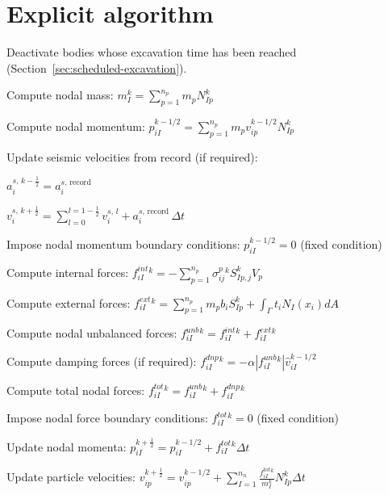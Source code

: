 \section{Explicit algorithm}\label{sec:explicit-algorithm}

\begin{algorithm}
	\caption{Explicit MPM integration scheme}
	\begin{algorithmic}[1]
		\State Deactivate bodies whose excavation time has been reached (Section~\ref{sec:scheduled-excavation}).
		
		\State Compute nodal mass:
		$ m_I^k = \sum_{p=1}^{n_p} m_p N_{Ip}^k $
		
		\State Compute nodal momentum:
		$ p_{iI}^{k-1/2} = \sum_{p=1}^{n_p} m_p v_{ip}^{k-1/2} N_{Ip}^k $
		
		\State Update seismic velocities from record (if required):
		
		$a_{i}^{s,\,k-\frac12} = a_{i}^{s,\,\text{record}}$
		
		$ v_i^{s,\,k+\frac12} = \sum_{l=0}^{l=1-\frac12} v_i^{s,\,l} + a_{i}^{s,\,\text{record}}\, \Delta t $
		
		\State Impose nodal momentum boundary conditions:
		$p_{iI}^{k-1/2} = 0 $ (fixed condition) 
		
		\State Compute internal forces:
		$ f_{iI}^{int}{}^{k} = - \sum_{p=1}^{n_p} \sigma_{ij}^{p}{}^{k} S_{Ip,j}^{k} V_p $
		
		\State Compute external forces:
		$ f_{iI}^{ext}{}^{k} = \sum_{p=1}^{n_p} m_p b_{i} S_{Ip}^{k} + \int_{\Gamma} t_i N_I(x_i) dA $
		
		\State Compute nodal unbalanced forces:
		$ f_{iI}^{unb}{}^{k} = f_{iI}^{int}{}^{k} + f_{iI}^{ext}{}^{k} $
		
		\State Compute damping forces (if required):
		$ f_{iI}^{dnp}{}^{k} = - \alpha |f_{iI}^{unb}{}^{k}| \hat{v}_{iI}^{k-1/2} $
		
		\State Compute total nodal forces:
		$ f_{iI}^{tot}{}^{k} = f_{iI}^{unb}{}^{k} + f_{iI}^{dnp}{}^{k} $
		
		\State Impose nodal force boundary conditions:
		$ f_{iI}^{tot}{}^{k} = 0 $ (fixed condition)
		
		\State Update nodal momenta:
		$ p_{iI}^{k+\frac12} = p_{iI}^{k-1/2} + f_{iI}^{tot}{}^{k} \Delta t $
		
		\State Update particle velocities:
		$ v_{ip}^{k+\frac12} = v_{ip}^{k-1/2} + \sum_{I=1}^{n_n} \frac {f_{iI}^{tot}{}^{k}}{m_I^k} N_{Ip}^k \Delta t $
		

\end{algorithmic}
\end{algorithm}
